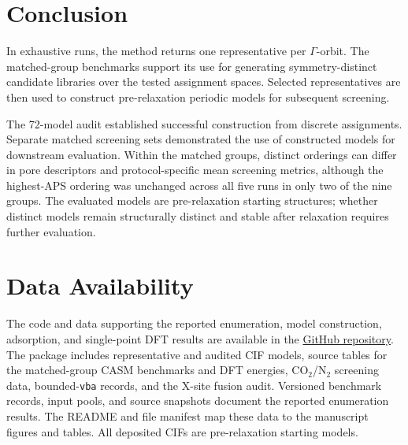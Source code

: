 \documentclass[a5paper, 10pt]{article}
\begin{document}
\section{Conclusion}
\label{sec:discussion}
In exhaustive runs, the method returns one representative per $\Gamma$-orbit. The matched-group benchmarks support its use for generating symmetry-distinct candidate libraries over the tested assignment spaces. Selected representatives are then used to construct pre-relaxation periodic models for subsequent screening.

The 72-model audit established successful construction from discrete assignments. Separate matched screening sets demonstrated the use of constructed models for downstream evaluation. Within the matched groups, distinct orderings can differ in pore descriptors and protocol-specific mean screening metrics, although the highest-APS ordering was unchanged across all five runs in only two of the nine groups. The evaluated models are pre-relaxation starting structures; whether distinct models remain structurally distinct and stable after relaxation requires further evaluation.

\section*{Data Availability}
\label{sec:data}
The code and data supporting the reported enumeration, model construction, adsorption, and single-point DFT results are available in the \href{https://github.com/Buct454/mof-enumeration-reconstruction.git}{GitHub repository}. The package includes representative and audited CIF models, source tables for the matched-group CASM benchmarks and DFT energies, CO$_2$/N$_2$ screening data, bounded-\texttt{vba} records, and the X-site fusion audit. Versioned benchmark records, input pools, and source snapshots document the reported enumeration results. The README and file manifest map these data to the manuscript figures and tables. All deposited CIFs are pre-relaxation starting models.
\end{document}
